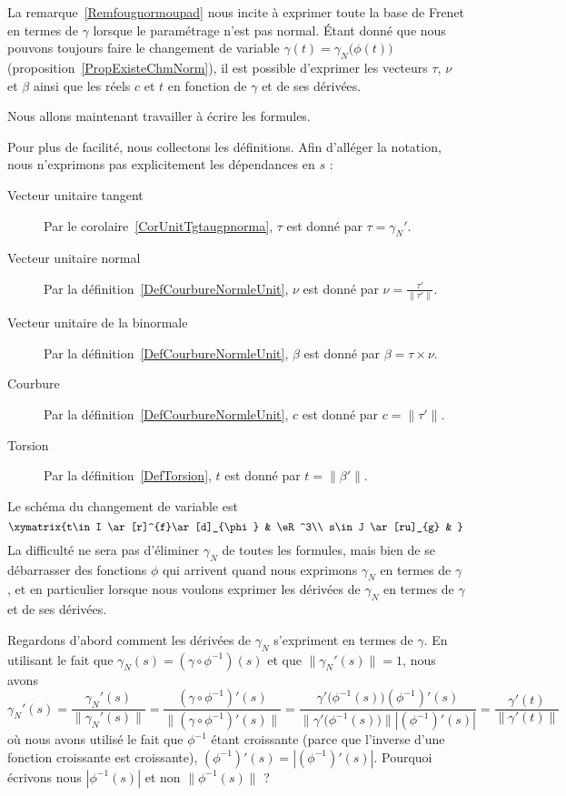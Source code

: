 La remarque~\ref{Remfougnormoupad} nous incite à exprimer toute la base de Frenet en termes de \( \gamma\) lorsque le paramétrage n'est pas normal. Étant donné que nous pouvons toujours faire le changement de variable \( \gamma(t)=\gamma_N\big( \phi(t) \big)\) (proposition~\ref{PropExisteChmNorm}), il est possible d'exprimer les vecteurs \( \tau\), \( \nu\) et \( \beta\) ainsi que les réels \( c\) et \( t\) en fonction de \( \gamma\) et de ses dérivées.

Nous allons maintenant travailler à écrire les formules.

Pour plus de facilité, nous collectons les définitions. Afin d'alléger la notation, nous n'exprimons pas explicitement les dépendances en \( s\) :
\begin{description}
	\item[Vecteur unitaire tangent]
	      Par le corolaire~\ref{CorUnitTgtaugpnorma}, \( \tau\) est donné par \( \tau=\gamma_N'\).
	\item[Vecteur unitaire normal]
	      Par la définition~\ref{DefCourbureNormleUnit}, \( \nu\) est donné par
	      \( \nu=\frac{ \tau' }{ \| \tau' \| }\).
	\item[Vecteur unitaire de la binormale]
	      Par la définition~\ref{DefCourbureNormleUnit}, \( \beta\) est donné par
	      \( \beta=\tau\times\nu\).
	\item[Courbure]
	      Par la définition~\ref{DefCourbureNormleUnit}, \( c\) est donné par
	      \( c=\| \tau' \|\).
	\item[Torsion]
	      Par la définition~\ref{DefTorsion}, \( t\) est donné par
	      \( t=\| \beta' \|\).
\end{description}


Le schéma du changement de variable est
\begin{equation}        \label{EqDiagIJstgvpR}
	\xymatrix{%
		t\in I \ar[r]^{f}\ar[d]_{\phi}      &   \eR^3\\
		s\in J \ar[ru]_{g}  &
	}
\end{equation}
La difficulté ne sera pas d'éliminer \( \gamma_N\) de toutes les formules, mais bien de se débarrasser des fonctions \( \phi\) qui arrivent quand nous exprimons \( \gamma_N\) en termes de \( \gamma\), et en particulier lorsque nous voulons exprimer les dérivées de \( \gamma_N\) en termes de \( \gamma\) et de ses dérivées.

Regardons d'abord comment les dérivées de \( \gamma_N\) s'expriment en termes de \( \gamma\). En utilisant le fait que \( \gamma_N(s)=(\gamma\circ\phi^{-1})(s)\) et que \( \| \gamma_N'(s) \|=1\), nous avons
\begin{equation}        \label{EqgpNgpnNnr}
	\gamma_N'(s)=\frac{ \gamma_N'(s) }{ \| \gamma_N'(s) \| }
	=\frac{ (\gamma\circ\phi^{-1})'(s) }{ \| (\gamma\circ\phi^{-1})'(s) \| }
	=\frac{ \gamma'\big( \phi^{-1}(s) \big)   (\phi^{-1})'(s)   }{ \| \gamma'\big( \phi^{-1}(s) \big) \|  |(\phi^{-1})'(s) |}
	=\frac{ \gamma'(t) }{ \| \gamma'(t) \| }
\end{equation}
où nous avons utilisé le fait que \( \phi^{-1}\) étant croissante (parce que l'inverse d'une fonction croissante est croissante), \( (\phi^{-1})'(s)=| (\phi^{-1})'(s) |\). Pourquoi écrivons nous \( | \phi^{-1}(s) |\) et non \( \| \phi^{-1}(s) \|\) ?

